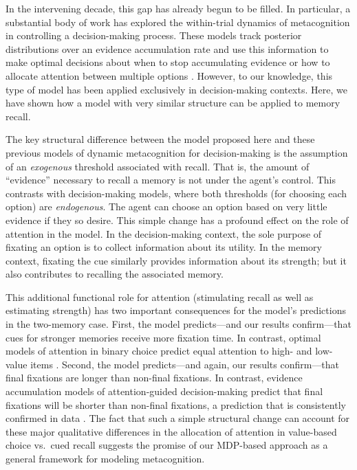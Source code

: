 In the intervening decade, this gap has already begun to be filled. In particular, a substantial body of work has explored the within-trial dynamics of metacognition in controlling a decision-making process. These models track posterior distributions over an evidence accumulation rate and use this information to make optimal decisions about when to stop accumulating evidence \citep{drugowitsch2012cost,woodford2014stochastic,bitzer2014perceptual,fudenberg2018speed,tajima2019optimal} or how to allocate attention between multiple options \citep{jang2021optimal,callaway2021fixation}. However, to our knowledge, this type of model has been applied exclusively in decision-making contexts. Here, we have shown how a model with very similar structure can be applied to memory recall. 

The key structural difference between the model proposed here and these previous models of dynamic metacognition for decision-making is the assumption of an \emph{exogenous} threshold associated with recall. That is, the amount of ``evidence'' necessary to recall a memory is not under the agent's control. This contrasts with decision-making models, where both thresholds (for choosing each option) are \emph{endogenous}. The agent can choose an option based on very little evidence if they so desire. This simple change has a profound effect on the role of attention in the model. In the decision-making context, the sole purpose of fixating an option is to collect information about its utility. In the memory context, fixating the cue similarly provides information about its strength; but it also contributes to recalling the associated memory. 

This additional functional role for attention (stimulating recall as well as estimating strength) has two important consequences for the model's predictions in the two-memory case. First, the model predicts---and our results confirm---that cues for stronger memories receive more fixation time. In contrast, optimal models of attention in binary choice predict equal attention to high- and low-value items \citep{callaway2021fixation,jang2021optimal,fudenberg2018speed}.
Second, the model predicts---and again, our results confirm---that final fixations are longer than non-final fixations. In contrast, evidence accumulation models of attention-guided decision-making predict that final fixations will be shorter than non-final fixations, a prediction that is consistently confirmed in data \citep{krajbich2010visual,krajbich2011multialternative,tavares2017attentional}. The fact that such a simple structural change can account for these major qualitative differences in the allocation of attention in value-based choice vs.~cued recall suggests the promise of our MDP-based approach as a general framework for modeling metacognition.


